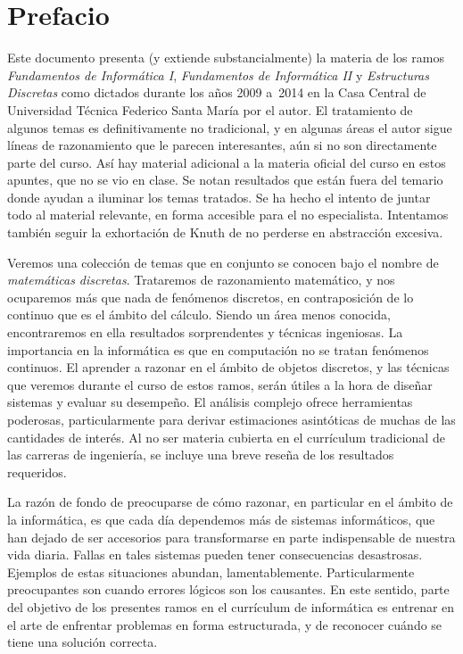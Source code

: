 %

\chapter*{Prefacio}
\label{cha:prefacio}

  Este documento presenta
  (y extiende substancialmente)
  la materia de los ramos \emph{Fundamentos de Informática I},
  \emph{Fundamentos de Informática II}
  y \emph{Estructuras Discretas}
  como dictados durante los años 2009 a~2014
  en la Casa Central de Universidad Técnica Federico Santa María
  por el autor.
  El tratamiento de algunos temas es definitivamente no tradicional,
  y en algunas áreas el autor sigue líneas de razonamiento
  que le parecen interesantes,
  aún si no son directamente parte del curso.
  Así hay material adicional
  a la materia oficial del curso en estos apuntes,
  que no se vio en clase.
  Se notan resultados que están fuera del temario
  donde ayudan a iluminar los temas tratados.
  Se ha hecho el intento de juntar todo al material relevante,
  en forma accesible para el no especialista.
  Intentamos también seguir la exhortación de Knuth de no perderse
  en abstracción excesiva.

  Veremos una colección de temas
  que en conjunto se conocen
  bajo el nombre de \emph{matemáticas discretas}.
  Trataremos de razonamiento matemático,
  y nos ocuparemos más que nada de fenómenos discretos,
  en contraposición de lo continuo que es el ámbito del cálculo.
  Siendo un área menos conocida,
  encontraremos en ella resultados sorprendentes
  y técnicas ingeniosas.
  La importancia en la informática
  es que en computación no se tratan fenómenos continuos.
  El aprender a razonar en el ámbito de objetos discretos,
  y las técnicas que veremos durante el curso de estos ramos,
  serán útiles a la hora de diseñar sistemas
  y evaluar su desempeño.
  El análisis complejo ofrece herramientas poderosas,
  particularmente para derivar estimaciones asintóticas
  de muchas de las cantidades de interés.
  Al no ser materia cubierta
  en el currículum tradicional de las carreras de ingeniería,
  se incluye una breve reseña de los resultados requeridos.

  La razón de fondo de preocuparse de cómo razonar,
  en particular en el ámbito de la informática,
  es que cada día dependemos más de sistemas informáticos,
  que han dejado de ser accesorios
  para transformarse en parte indispensable
  de nuestra vida diaria.
  Fallas en tales sistemas pueden tener consecuencias desastrosas.
  Ejemplos de estas situaciones abundan,
  lamentablemente.
  Particularmente preocupantes son cuando errores lógicos
  son los causantes.
  En este sentido,
  parte del objetivo
  de los presentes ramos en el currículum de informática
  es entrenar en el arte
  de enfrentar problemas en forma estructurada,
  y de reconocer cuándo se tiene una solución correcta.

